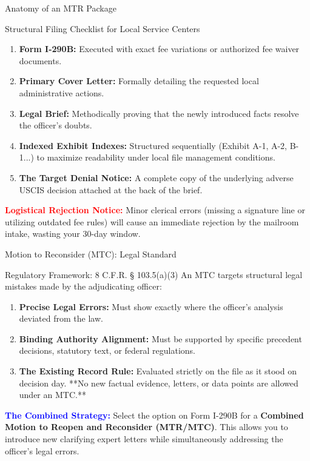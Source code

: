 \documentclass[11pt]{beamer}
\begin{document}
	\begin{frame}{Anatomy of an MTR Package}
		\scriptsize
		\begin{block}{Structural Filing Checklist for Local Service Centers}
			\begin{enumerate}
				\item \textbf{Form I-290B:} Executed with exact fee variations or authorized fee waiver documents.
				\item \textbf{Primary Cover Letter:} Formally detailing the requested local administrative actions.
				\item \textbf{Legal Brief:} Methodically proving that the newly introduced facts resolve the officer's doubts.
				\item \textbf{Indexed Exhibit Indexes:} Structured sequentially (Exhibit A-1, A-2, B-1...) to maximize readability under local file management conditions.
				\item \textbf{The Target Denial Notice:} A complete copy of the underlying adverse USCIS decision attached at the back of the brief.
			\end{enumerate}
			\vspace{0.1in}
			\textcolor{red}{\textbf{Logistical Rejection Notice:}} Minor clerical errors (missing a signature line or utilizing outdated fee rules) will cause an immediate rejection by the mailroom intake, wasting your 30-day window.
		\end{block}
	\end{frame}
	
	
	\begin{frame}{Motion to Reconsider (MTC): Legal Standard}
		\scriptsize
		\begin{block}{Regulatory Framework: 8 C.F.R. § 103.5(a)(3)}
			An MTC targets structural legal mistakes made by the adjudicating officer:
			\begin{enumerate}
				\item \textbf{Precise Legal Errors:} Must show exactly where the officer's analysis deviated from the law.
				\item \textbf{Binding Authority Alignment:} Must be supported by specific precedent decisions, statutory text, or federal regulations.
				\item \textbf{The Existing Record Rule:} Evaluated strictly on the file as it stood on decision day. **No new factual evidence, letters, or data points are allowed under an MTC.**
			\end{enumerate}
			\vspace{0.15cm}
			\textcolor{blue}{\textbf{The Combined Strategy:}} Select the option on Form I-290B for a \textbf{Combined Motion to Reopen and Reconsider (MTR/MTC)}. This allows you to introduce new clarifying expert letters while simultaneously addressing the officer's legal errors.
		\end{block}
	\end{frame}
	
\end{document}
